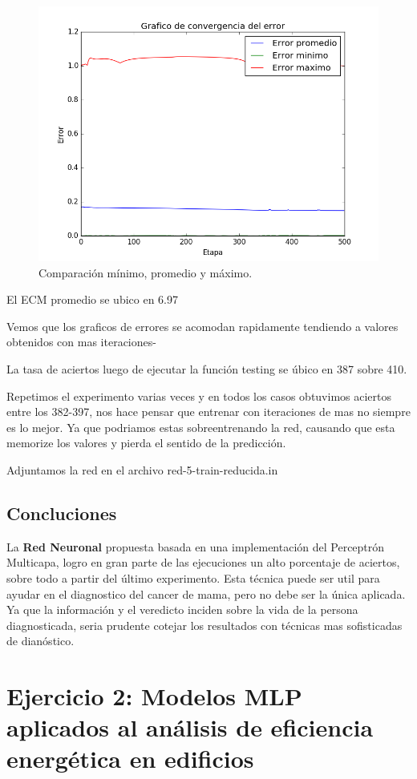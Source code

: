 \documentclass[onecolumn,10pt]{article}
\begin{document}
\begin{figure}[H]
  \centering
  \includegraphics[width=0.7\columnwidth]{red_5_prom_reducida.png}
  \caption{Comparación mínimo, promedio y máximo.}
  \label{fig:red promedios}
\end{figure}

El ECM promedio se ubico en 6.97

Vemos que los graficos de errores se acomodan rapidamente tendiendo a valores obtenidos
con mas iteraciones-

La tasa de aciertos luego de ejecutar la función testing se úbico en 387 sobre 410.

Repetimos el experimento varias veces y en todos los casos obtuvimos aciertos entre los
382-397, nos hace pensar que entrenar con iteraciones de mas no siempre es lo mejor.
Ya que podriamos estas sobreentrenando la red, causando que esta memorize los valores
y pierda el sentido de la predicción.

Adjuntamos la red en el archivo red-5-train-reducida.in


\subsection{Concluciones}

La \textbf{Red Neuronal} propuesta basada en una implementación del Perceptrón Multicapa,
logro en gran parte de las ejecuciones un alto porcentaje de aciertos, sobre todo a 
partir del último experimento.
Esta técnica puede ser util para ayudar en el diagnostico del cancer de mama, pero
no debe ser la única aplicada. Ya que la información y el veredicto inciden
sobre la vida de la persona diagnosticada, seria prudente cotejar los resultados
con técnicas mas sofisticadas de dianóstico.


\newpage


\section{Ejercicio 2: Modelos MLP aplicados al análisis de eficiencia energética en edificios}
\end{document}
